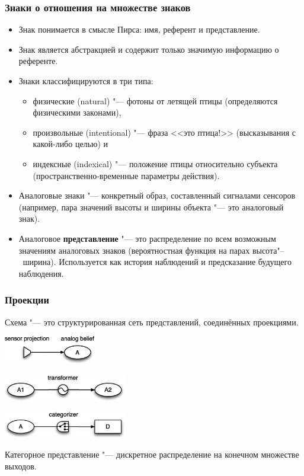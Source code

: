\documentclass[default]{beamer}
\begin{document}
	\begin{frame}
		\frametitle{Знаки о отношения на множестве знаков}
		\vspace{-2mm}
		\begin{itemize}
			\item Знак понимается в смысле Пирса: имя, референт и представление.
			\item Знак является абстракцией и содержит только значимую информацию о референте.
			\item Знаки классифицируются в три типа: 
			\begin{itemize}
				\item физические (natural) "--- фотоны от летящей птицы (определяются физическими законами),
				\item произвольные (intentional) "--- фраза <<это птица!>> (высказывания с какой-либо целью) и
				\item индексные (indexical) "--- положение птицы относительно субъекта (пространственно-временные параметры действия).
			\end{itemize}
			\item Аналоговые знаки "--- конкретный образ, составленный сигналами сенсоров (например, пара значений высоты и ширины объекта "--- это аналоговый знак).		
			\item Аналоговое \textbf{представление} "--- это распределение по всем возможным значениям аналоговых знаков (вероятностная функция на парах высота"--~ширина). Используется как история наблюдений и предсказание будущего наблюдения.
		\end{itemize}
	\end{frame}

	\begin{frame}
		\frametitle{Проекции}
		
		Схема "--- это структурированная сеть представлений, соединённых проекциями.
		
		\begin{center}
			\includegraphics[width=0.3\textwidth]{roy_sens_proj}
			\par\bigskip
			\includegraphics[width=0.4\textwidth]{roy_transf_proj}
			\par\bigskip
			\includegraphics[width=0.4\textwidth]{roy_cat_proj}
		\end{center}
		
		Категорное представление "--- дискретное распределение на конечном множестве выходов.
	\end{frame}
	
\end{document}
